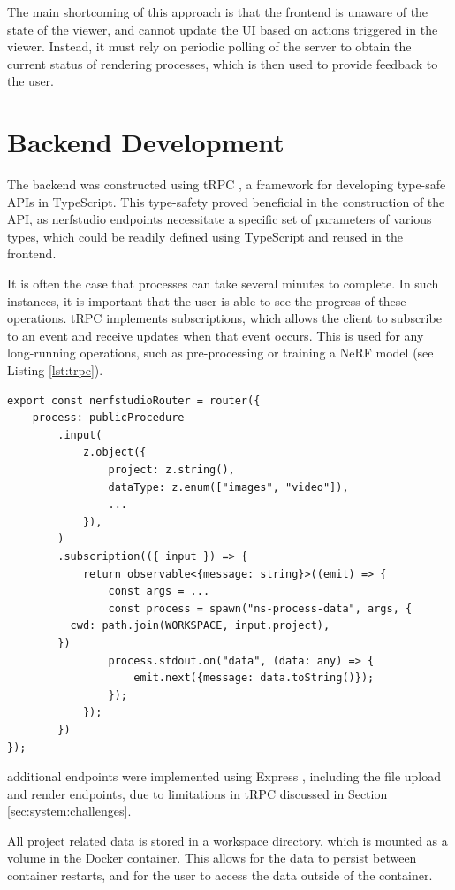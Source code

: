 The main shortcoming of this approach is that the frontend is unaware of the state of the viewer, and cannot update the UI based on actions triggered in the viewer.
Instead, it must rely on periodic polling of the server to obtain the current status of rendering processes, which is then used to provide feedback to the user.

\section{Backend Development}
\label{sec:system:backend}

The backend was constructed using tRPC \cite{noauthor_trpc_nodate}, a framework for developing type-safe APIs in TypeScript.
This type-safety proved beneficial in the construction of the API, as nerfstudio endpoints necessitate a specific set of parameters of various types, which could be readily defined using TypeScript and reused in the frontend.

It is often the case that processes can take several minutes to complete.
In such instances, it is important that the user is able to see the progress of these operations.
tRPC implements subscriptions, which allows the client to subscribe to an event and receive updates when that event occurs.
This is used for any long-running operations, such as pre-processing or training a NeRF model (see Listing \ref{lst:trpc}).

\begin{lstlisting}[style=ES6, caption=Example tRPC endpoint for Pre-Processing returning a subscription., label=lst:trpc]
export const nerfstudioRouter = router({
	process: publicProcedure
		.input(
			z.object({
				project: z.string(),
				dataType: z.enum(["images", "video"]),
				...
			}),
		)
		.subscription(({ input }) => {
			return observable<{message: string}>((emit) => {
				const args = ...
				const process = spawn("ns-process-data", args, {
          cwd: path.join(WORKSPACE, input.project),
        })
				process.stdout.on("data", (data: any) => {
					emit.next({message: data.toString()});
				});
			});
		})
});
\end{lstlisting}

additional endpoints were implemented using Express \cite{noauthor_express_nodate}, including the file upload and render endpoints, due to limitations in tRPC discussed in Section \ref{sec:system:challenges}.

All project related data is stored in a workspace directory, which is mounted as a volume in the Docker container.
This allows for the data to persist between container restarts, and for the user to access the data outside of the container.

